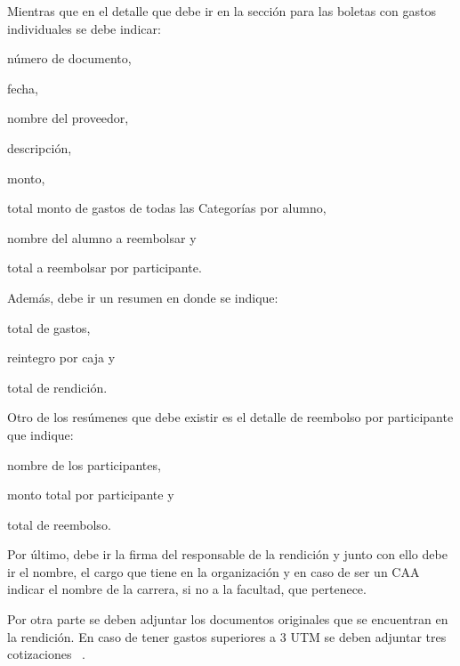   Mientras que en el detalle que debe ir en la sección para las boletas con gastos individuales se debe indicar:
  \begin{enumerate*}[label=(\roman*)]
    \item número de documento,
    \item fecha,
    \item nombre del proveedor,
    \item descripción,
    \item monto,
    \item total monto de gastos de todas las Categorías por alumno,
    \item nombre del alumno a reembolsar y
    \item total a reembolsar por participante.
  \end{enumerate*}
  
  Además, debe ir un resumen en donde se indique:
  \begin{enumerate*}[label=(\roman*)]
    \item total de gastos,
    \item reintegro por caja y
    \item total de rendición.
  \end{enumerate*}
  
  Otro de los resúmenes que debe existir es el detalle de reembolso por participante que indique:
  \begin{enumerate*}[label=(\roman*)]
    \item nombre de los participantes,
    \item monto total por participante y
    \item total de reembolso.
  \end{enumerate*}
  
  Por último, debe ir la firma del responsable de la rendición y junto con ello debe ir el nombre, el cargo que tiene en la organización y en caso de ser un CAA indicar el nombre de la carrera, si no a la facultad, que pertenece.
  
  Por otra parte se deben adjuntar los documentos originales que se encuentran en la rendición. En caso de tener gastos superiores a 3 UTM se deben adjuntar tres cotizaciones ~\cite{5}.
  
  